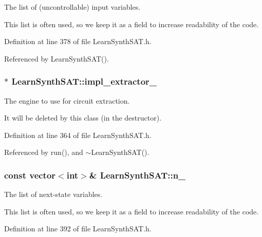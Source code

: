 The list of (uncontrollable) input variables. 

This list is often used, so we keep it as a field to increase readability of the code. 

Definition at line 378 of file Learn\-Synth\-S\-A\-T.\-h.



Referenced by Learn\-Synth\-S\-A\-T().

\hypertarget{classLearnSynthSAT_a1c7a39732a4ee3cd1ec877f2642046fc}{
\subsubsection[{impl\-\_\-extractor\-\_\-}]{$\ast$ Learn\-Synth\-S\-A\-T\-::impl\-\_\-extractor\-\_\-\hspace{0.3cm}{\ttfamily [protected]}}}\label{classLearnSynthSAT_a1c7a39732a4ee3cd1ec877f2642046fc}


The engine to use for circuit extraction. 

It will be deleted by this class (in the destructor). 

Definition at line 364 of file Learn\-Synth\-S\-A\-T.\-h.



Referenced by run(), and $\sim$\-Learn\-Synth\-S\-A\-T().

\hypertarget{classLearnSynthSAT_a00af554fd3553881b45182300756ca0e}{
\subsubsection[{n\-\_\-}]{\setlength{\rightskip}{0pt plus 5cm}const vector$<$int$>$\& Learn\-Synth\-S\-A\-T\-::n\-\_\-\hspace{0.3cm}{\ttfamily [protected]}}}\label{classLearnSynthSAT_a00af554fd3553881b45182300756ca0e}


The list of next-\/state variables. 

This list is often used, so we keep it as a field to increase readability of the code. 

Definition at line 392 of file Learn\-Synth\-S\-A\-T.\-h.



